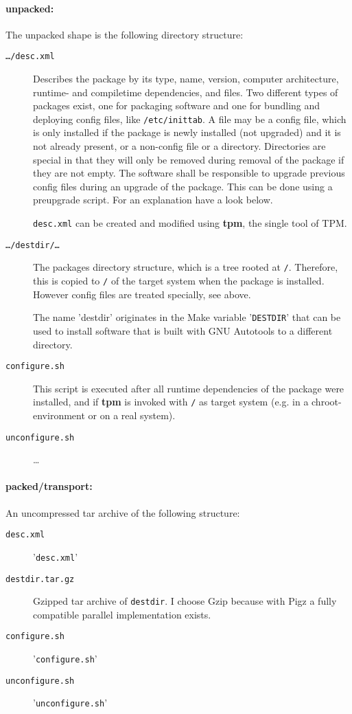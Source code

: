 \documentclass[a4paper]{article}
\newcommand{\file}[1]{\texttt{#1}}
\newcommand{\program}[1]{\textbf{#1}}
\newcommand{\variable}[1]{'\texttt{#1}'}
\begin{document}
	\paragraph{unpacked:}
	The unpacked shape is the following directory structure:
	\begin{description}
		\item[\file{\dots/desc.xml}] Describes the package by its type, name, version, computer architecture, runtime- and compiletime dependencies, and files. Two different types of packages exist, one for packaging software and one for bundling and deploying config files, like \file{/etc/inittab}. A file may be a config file, which is only installed if the package is newly installed (not upgraded) and it is not already present, or a non-config file or a directory. Directories are special in that they will only be removed during removal of the package if they are not empty. The software shall be responsible to upgrade previous config files during an upgrade of the package. This can be done using a preupgrade script. For an explanation have a look below.
		
		\file{desc.xml} can be created and modified using \program{tpm}, the single tool of TPM.
		
		\item[\file{\dots/destdir/\dots}] The packages directory structure, which is a tree rooted at \file{/}. Therefore, this is copied to \file{/} of the target system when the package is installed. However config files are treated specially, see above.
		
		The name 'destdir' originates in the Make variable \variable{DESTDIR} that can be used to install software that is built with GNU Autotools to a different directory.
		
		\item[\file{configure.sh}] This script is executed after all runtime dependencies of the package were installed, and if \program{tpm} is invoked with \file{/} as target system (e.g. in a chroot-environment or on a real system).
		
		\item[\file{unconfigure.sh}] \dots
	\end{description}

	\paragraph{packed/transport:}
	An uncompressed tar archive of the following structure:
	\begin{description}
		\item[\file{desc.xml}] '\file{desc.xml}'
		
		\item[\file{destdir.tar.gz}] Gzipped tar archive of \file{destdir}. I choose Gzip because with Pigz a fully compatible parallel implementation exists.
		
		\item[\file{configure.sh}] '\file{configure.sh}'
		
		\item[\file{unconfigure.sh}] '\file{unconfigure.sh}'
	\end{description}
	
\end{document}
